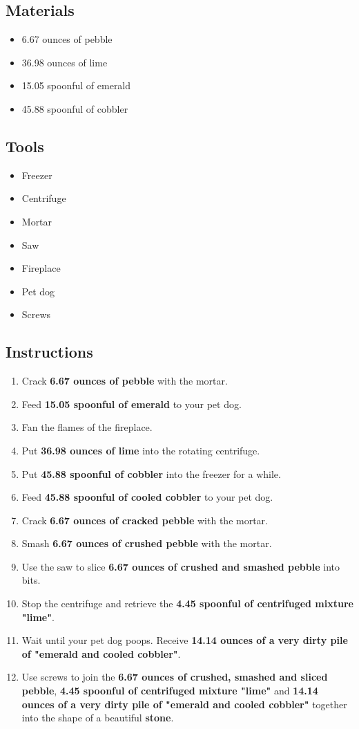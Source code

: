 \documentclass{article}
\begin{document}
\subsection{Materials}\begin{itemize}
\item 
6.67 ounces of pebble
\item 
36.98 ounces of lime
\item 
15.05 spoonful of emerald
\item 
45.88 spoonful of cobbler
\end{itemize}
\subsection{Tools}\begin{itemize}
\item 
Freezer
\item 
Centrifuge
\item 
Mortar
\item 
Saw
\item 
Fireplace
\item 
Pet dog
\item 
Screws
\end{itemize}
\subsection{Instructions}\begin{enumerate}
\item 
Crack \textbf{6.67 ounces of pebble} with the mortar.
\item 
Feed \textbf{15.05 spoonful of emerald} to your pet dog.
\item 
Fan the flames of the fireplace.
\item 
Put \textbf{36.98 ounces of lime} into the rotating centrifuge.
\item 
Put \textbf{45.88 spoonful of cobbler} into the freezer for a while.
\item 
Feed \textbf{45.88 spoonful of cooled cobbler} to your pet dog.
\item 
Crack \textbf{6.67 ounces of cracked pebble} with the mortar.
\item 
Smash \textbf{6.67 ounces of crushed pebble} with the mortar.
\item 
Use the saw to slice \textbf{6.67 ounces of crushed and smashed pebble} into bits.
\item 
Stop the centrifuge and retrieve the \textbf{4.45 spoonful of centrifuged mixture "lime"}.
\item 
Wait until your pet dog poops. Receive \textbf{14.14 ounces of a very dirty pile of "emerald and cooled cobbler"}.
\item 
Use screws to join the \textbf{6.67 ounces of crushed, smashed and sliced pebble}, \textbf{4.45 spoonful of centrifuged mixture "lime"} and \textbf{14.14 ounces of a very dirty pile of "emerald and cooled cobbler"} together into the shape of a beautiful \textbf{stone}.
\end{enumerate}
\newpage
\end{document}
